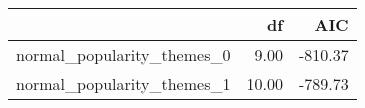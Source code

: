 \begin{table}[ht]
\centering
\begin{tabular}{rrr}
  \hline
 & df & AIC \\ 
  \hline
normal\_popularity\_themes\_0 & 9.00 & -810.37 \\ 
  normal\_popularity\_themes\_1 & 10.00 & -789.73 \\ 
   \hline
\end{tabular}
\end{table}
